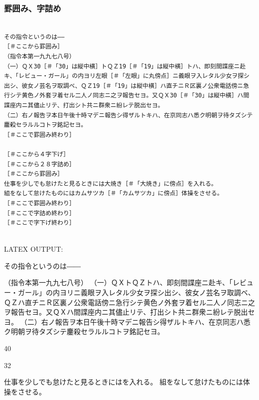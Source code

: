\documentclass[a4paper,tate]{jlreq}
\begin{document}
\subsubsection*{罫囲み、字詰め}
\footnotesize
\linespread{1.0}
\begin{verbatim}

その指令というのは――
［＃ここから罫囲み］
（指令本第一九九七八号）
（一）ＱＸ30［＃「30」は縦中横］トＱＺ19［＃「19」は縦中横］トハ、即刻間諜座ニ赴キ、「レビュー・ガール」の内ヨリ左眼［＃「左眼」に丸傍点］ニ義眼ヲ入レタル少女ヲ探シ出シ、彼女ノ芸名ヲ取調ベ、ＱＺ19［＃「19」は縦中横］ハ直チニＲ区裏ノ公衆電話傍ニ急行シテ黄色ノ外套ヲ着セル二人ノ同志ニ之ヲ報告セヨ。又ＱＸ30［＃「30」は縦中横］ハ間諜座内ニ其儘止リテ、打出シト共ニ群衆ニ紛レテ脱出セヨ。
（二）右ノ報告ヲ本日午後十時マデニ報告シ得ザルトキハ、在京同志ハ悉ク明朝ヲ待タズシテ鏖殺セラルルコトヲ銘記セヨ。
［＃ここで罫囲み終わり］

［＃ここから４字下げ］
［＃ここから２８字詰め］
［＃ここから罫囲み］
仕事を少しでも怠けたと見るときには大焼き［＃「大焼き」に傍点］を入れる。
組をなして怠けたものにはカムサツカ［＃「カムサツカ」に傍点］体操をさせる。
［＃ここで罫囲み終わり］
［＃ここで字詰め終わり］
［＃ここで字下げ終わり］


\end{verbatim}
\linespread{1.4}
\normalsize
LATEX OUTPUT:
\zw


その指令というのは――

\begin{azconvFramed}
（指令本第一九九七八号）
（一）ＱＸトＱＺトハ、即刻間諜座ニ赴キ、「レビュー・ガール」の内ヨリニ義眼ヲ入レタル少女ヲ探シ出シ、彼女ノ芸名ヲ取調ベ、ＱＺハ直チニＲ区裏ノ公衆電話傍ニ急行シテ黄色ノ外套ヲ着セル二人ノ同志ニ之ヲ報告セヨ。又ＱＸハ間諜座内ニ其儘止リテ、打出シト共ニ群衆ニ紛レテ脱出セヨ。
（二）右ノ報告ヲ本日午後十時マデニ報告シ得ザルトキハ、在京同志ハ悉ク明朝ヲ待タズシテ鏖殺セラルルコトヲ銘記セヨ。
\end{azconvFramed}

\begin{azconvIndented}{4\zw}{0\zw}

\begin{azconvNarrow}{32\zw}
\begin{azconvFramed}[leftmargin=4\zw, rightmargin=\dimexpr\linewidth -28\zw -5\zw]
仕事を少しでも怠けたと見るときにはを入れる。
組をなして怠けたものには体操をさせる。
\end{azconvFramed}
\end{azconvNarrow}
\end{azconvIndented}
\end{document}

